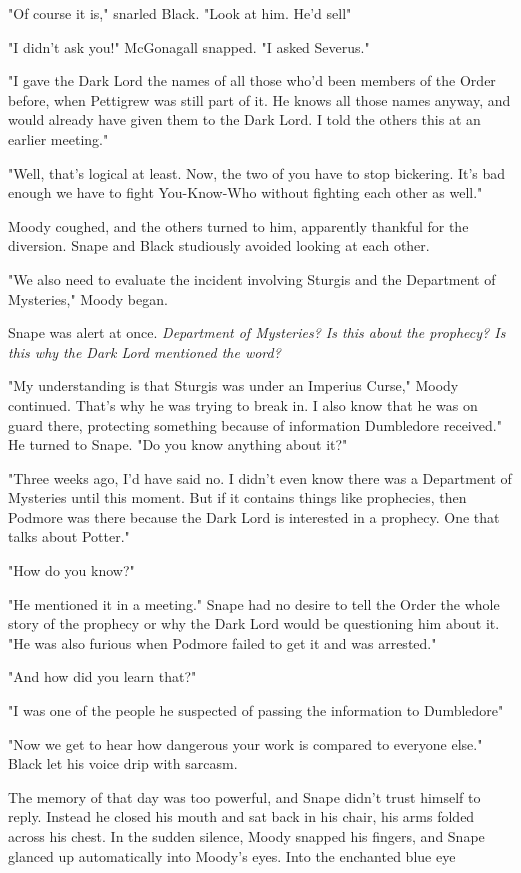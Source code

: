 "Of course it is," snarled Black. "Look at him. He'd sell{\el}"

"I didn't ask you!" McGonagall snapped. "I asked Severus."

"I gave the Dark Lord the names of all those who'd been members of the Order before, when Pettigrew was still part of it. He knows all those names anyway, and would already have given them to the Dark Lord. I told the others this at an earlier meeting."

"Well, that's logical at least. Now, the two of you have to stop bickering. It's bad enough we have to fight You-Know-Who without fighting each other as well."

Moody coughed, and the others turned to him, apparently thankful for the diversion. Snape and Black studiously avoided looking at each other.

"We also need to evaluate the incident involving Sturgis and the Department of Mysteries," Moody began.

Snape was alert at once. \emph{Department of Mysteries? Is this about the prophecy? Is this why the Dark Lord mentioned the word?}

"My understanding is that Sturgis was under an Imperius Curse," Moody continued. That's why he was trying to break in. I also know that he was on guard there, protecting something because of information Dumbledore received." He turned to Snape. "Do you know anything about it?"

"Three weeks ago, I'd have said no. I didn't even know there was a Department of Mysteries until this moment. But if it contains things like prophecies, then Podmore was there because the Dark Lord is interested in a prophecy. One that talks about Potter."

"How do you know?"

"He mentioned it in a meeting." Snape had no desire to tell the Order the whole story of the prophecy or why the Dark Lord would be questioning him about it. "He was also furious when Podmore failed to get it and was arrested."

"And how did you learn that?"

"I was one of the people he suspected of passing the information to Dumbledore{\el}"

"Now we get to hear how dangerous your work is compared to everyone else." Black let his voice drip with sarcasm.

The memory of that day was too powerful, and Snape didn't trust himself to reply. Instead he closed his mouth and sat back in his chair, his arms folded across his chest. In the sudden silence, Moody snapped his fingers, and Snape glanced up automatically into Moody's eyes. Into the enchanted blue eye{\el}

